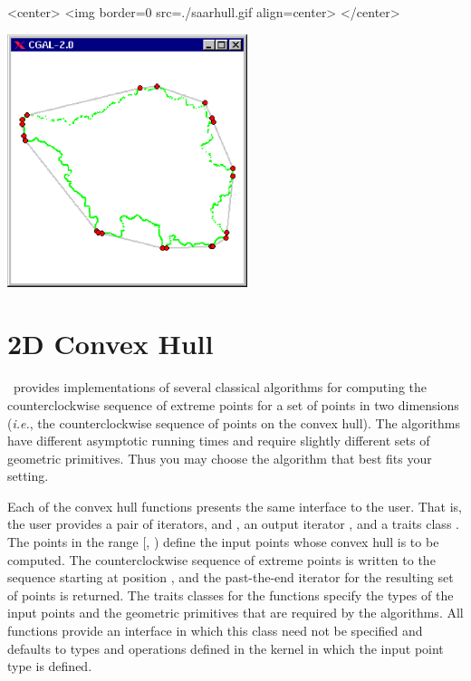\begin{ccHtmlOnly}
<center>
<img border=0 src=./saarhull.gif align=center>
</center>
\end{ccHtmlOnly} 

\begin{ccTexOnly}
\begin{center}
\includegraphics[width=7cm]{saarhull.eps}
\end{center}
\end{ccTexOnly}

\section{2D Convex Hull}
\label{sec:convex_hull_2}
\cgal\ provides implementations of several classical algorithms for
computing the counterclockwise sequence of extreme points for a set of 
points in two dimensions (\textit{i.e.}, the counterclockwise sequence 
of points on the convex hull).  The algorithms have different asymptotic
running times and require slightly different sets of geometric primitives. 
Thus you may choose the algorithm that best fits your setting.

Each of the convex hull functions presents the same interface to the
user.  That is, the user provides a pair of iterators, 
and , an output iterator ,  and a traits class
. The points in the range [, ) define
the input points whose convex hull is to be computed.  The counterclockwise
sequence of extreme points is written to the sequence starting at position
, and the past-the-end iterator for the resulting set of
points is returned.  The traits classes for the functions specify the types
of the input points and the geometric primitives that are required by
the algorithms. All functions provide an interface in which this
class need not be specified and defaults to types and operations defined
in the kernel in which the input point type is defined.


